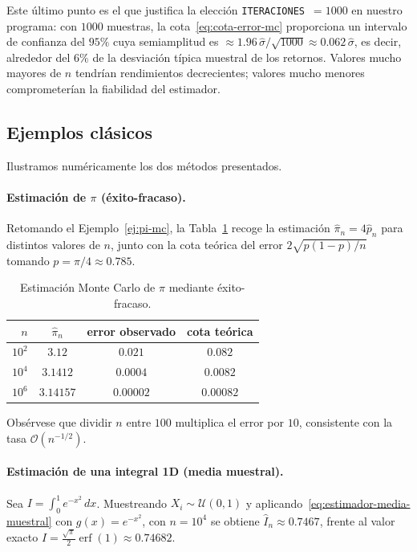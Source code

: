 Este último punto es el que justifica la elección \texttt{ITERACIONES}~$= 1000$ en nuestro programa: con $1000$ muestras, la cota~\eqref{eq:cota-error-mc} proporciona un intervalo de confianza del $95\%$ cuya semiamplitud es $\approx 1.96\,\hat\sigma/\sqrt{1000} \approx 0.062\,\hat\sigma$, es decir, alrededor del $6\%$ de la desviación típica muestral de los retornos. Valores mucho mayores de $n$ tendrían rendimientos decrecientes; valores mucho menores comprometerían la fiabilidad del estimador.

\subsection{Ejemplos clásicos}
\label{subsec:ejemplos-mc}

Ilustramos numéricamente los dos métodos presentados.

\paragraph{Estimación de $\pi$ (éxito-fracaso).} Retomando el Ejemplo~\ref{ej:pi-mc}, la Tabla~\ref{tab:pi-mc} recoge la estimación $\hat{\pi}_n = 4\hat{p}_n$ para distintos valores de $n$, junto con la cota teórica del error $2\sqrt{p(1-p)/n}$ tomando $p = \pi/4 \approx 0.785$.

\begin{table}[H]
\centering
\caption{Estimación Monte Carlo de $\pi$ mediante éxito-fracaso.}
\label{tab:pi-mc}
\begin{tabular}{rccc}
\toprule
$n$ & $\hat{\pi}_n$ & error observado & cota teórica \\
\midrule
$10^2$ & $3.12$ & $0.021$ & $0.082$ \\
$10^4$ & $3.1412$ & $0.0004$ & $0.0082$ \\
$10^6$ & $3.14157$ & $0.00002$ & $0.00082$ \\
\bottomrule
\end{tabular}
\end{table}

Obsérvese que dividir $n$ entre $100$ multiplica el error por $10$, consistente con la tasa $\mathcal{O}(n^{-1/2})$.

\paragraph{Estimación de una integral 1D (media muestral).} Sea $I = \int_0^1 e^{-x^2}\, dx$. Muestreando $X_i \sim \mathcal{U}(0,1)$ y aplicando~\eqref{eq:estimador-media-muestral} con $g(x) = e^{-x^2}$, con $n = 10^4$ se obtiene $\widehat{I}_n \approx 0.7467$, frente al valor exacto $I = \tfrac{\sqrt\pi}{2}\operatorname{erf}(1) \approx 0.74682$.

